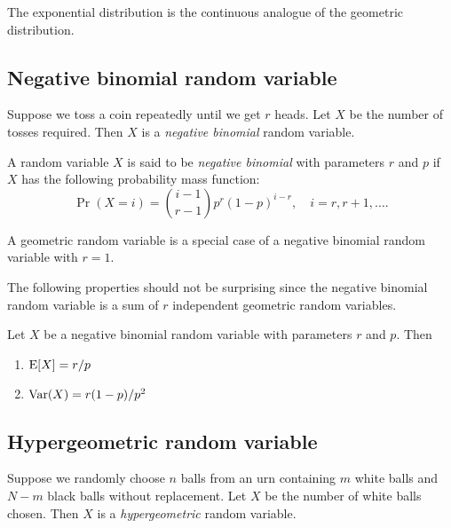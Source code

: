\documentclass{article}
\begin{document}
\begin{remark}
  The exponential distribution is the continuous analogue of the geometric distribution.
\end{remark}

\subsection{Negative binomial random variable}

Suppose we toss a coin repeatedly until we get $r$ heads.
Let $X$ be the number of tosses required.
Then $X$ is a \emph{negative binomial} random variable.

\begin{definition}
  A random variable $X$ is said to be \emph{negative binomial} with parameters $r$ and $p$ if $X$ has the following probability mass function:
  \[
    \Pr(X = i) = \binom{i - 1}{r - 1} p^r (1 - p)^{i - r}, \quad i = r, r + 1, \ldots.
  \]
\end{definition}

\begin{remark}
  A geometric random variable is a special case of a negative binomial random variable with $r = 1$.
\end{remark}

The following properties should not be surprising since the negative binomial random variable is a sum of $r$ independent geometric random variables.

\begin{proposition}
  Let $X$ be a negative binomial random variable with parameters $r$ and $p$.
  Then
  \begin{enumerate}
    \item $\operatorname{E}[X] = r/p$
    \item $\operatorname{Var}(X) = r(1 - p)/p^2$
  \end{enumerate}
\end{proposition}


\subsection{Hypergeometric random variable}

Suppose we randomly choose $n$ balls from an urn containing $m$ white balls and $N - m$ black balls without replacement.
Let $X$ be the number of white balls chosen.
Then $X$ is a \emph{hypergeometric} random variable.
\end{document}
